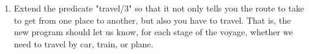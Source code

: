 \begin{enumerate}
\item{}Extend the predicate "travel/3" so that it not only tells you
the route to take to get from one place to another, but also
 you have to travel. That is, the new program should let
us know, for each stage of the voyage, whether we need to travel by
car, train, or plane.  \end{enumerate}
